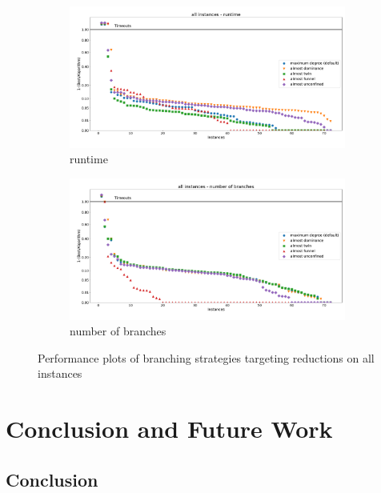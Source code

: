 \documentclass[12pt,a4paper,twoside]{scrartcl}
\numberwithin{equation}{section}
\begin{document}
\begin{figure}[hbt!]
	\begin{subfigure}{1\textwidth}
		\includegraphics[width=\textwidth]{images/plots/a2_all_t}
		\caption{runtime}
	\end{subfigure}
	\begin{subfigure}{1\textwidth}
		\includegraphics[width=\textwidth]{images/plots/a2_all_b}
		\caption{number of branches}
	\end{subfigure}
	\caption{Performance plots of branching strategies targeting reductions on all instances}
	\label{222}
\end{figure}

\clearpage


\section{Conclusion and Future Work} \label{sec6}
\subsection{Conclusion}
\end{document}
